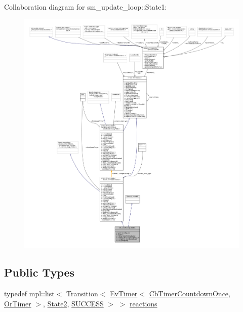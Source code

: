 Collaboration diagram for sm\+\_\+update\+\_\+loop\+:\+:State1\+:
\nopagebreak
\begin{figure}[H]
\begin{center}
\leavevmode
\includegraphics[width=350pt]{structsm__update__loop_1_1State1__coll__graph}
\end{center}
\end{figure}
\subsection*{Public Types}
\begin{DoxyCompactItemize}
\item 
typedef mpl\+::list$<$ Transition$<$ \hyperlink{structcl__ros__timer_1_1EvTimer}{Ev\+Timer}$<$ \hyperlink{classcl__ros__timer_1_1CbTimerCountdownOnce}{Cb\+Timer\+Countdown\+Once}, \hyperlink{classsm__update__loop_1_1OrTimer}{Or\+Timer} $>$, \hyperlink{structsm__update__loop_1_1State2}{State2}, \hyperlink{structsmacc_1_1default__transition__tags_1_1SUCCESS}{S\+U\+C\+C\+E\+SS} $>$ $>$ \hyperlink{structsm__update__loop_1_1State1_a828232579aa51d4fbfe9858c2a7016ad}{reactions}
\end{DoxyCompactItemize}
